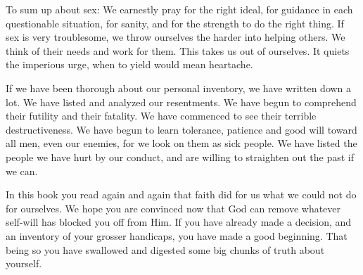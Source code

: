 \begin{biblechapter}
To sum up about sex:  We earnestly pray for the right ideal, for guidance in each questionable situation, for sanity, and for the strength to do the right thing.  If sex is very troublesome, we throw ourselves the harder into helping others.  We think of their needs and work for them.  This takes us out of ourselves.  It quiets the imperious urge, when to yield would mean heartache.

If we have been thorough about our personal inventory, we have written down a lot.  We have listed and analyzed our resentments.  We have begun to comprehend their futility and their fatality.  We have commenced to see their terrible destructiveness.  We have begun to learn tolerance, patience and good will toward all men, even our enemies, for we look on them as sick people.  We have listed the people we have hurt by our conduct, and are willing to straighten out the past if we can.

In this book you read again and again that faith did for us what we could not do for ourselves.  We hope you are convinced now that God can remove whatever self-will has blocked you off from Him.  If you have already made a decision, and an inventory of your grosser handicaps, you have made a good beginning.  That being so you have swallowed and digested some big chunks of truth about yourself.

\end{biblechapter}

